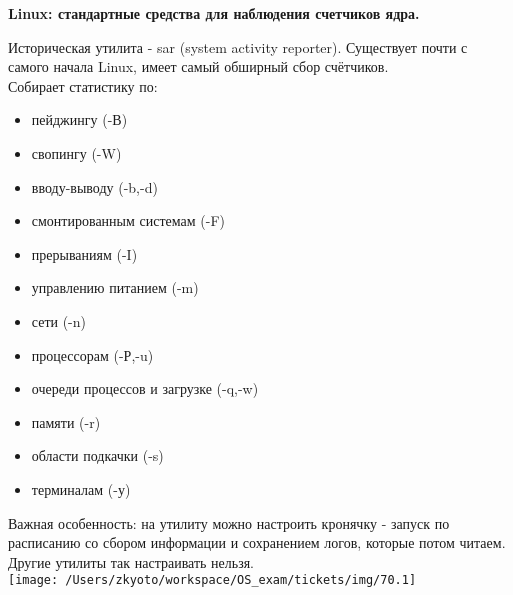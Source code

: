 
\LARGE
\textbf{Linux: стандартные средства для наблюдения счетчиков ядра.}\\
\normalsize

Историческая утилита - sar (system activity reporter). Существует почти с самого начала Linux, имеет самый обширный сбор счётчиков. \\
Собирает статистику по:
\begin{itemize}
    \item пейджингу (-В)
    \item свопингу (-W)
    \item вводу-выводу (-b,-d)
    \item смонтированным системам (-F)
    \item прерываниям (-I)
    \item управлению питанием (-m)
    \item сети (-n)
    \item процессорам (-Р,-u)
    \item очереди процессов и загрузке (-q,-w)
    \item памяти (-r)
    \item области подкачки (-s)
    \item терминалам (-у)
\end{itemize}
Важная особенность: на утилиту можно настроить кронячку - запуск по расписанию со сбором информации и сохранением логов,
которые потом читаем. Другие утилиты так настраивать нельзя.\\

\texttt{[image: /Users/zkyoto/workspace/OS\_exam/tickets/img/70.1]}
\newpage